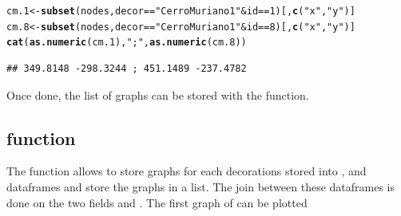 \documentclass[article]{jss}\usepackage[]{graphicx}\usepackage[]{color}
\makeatletter
\newcommand{\hlnum}[1]{\textcolor[rgb]{0.686,0.059,0.569}{#1}}%
\newcommand{\hlstr}[1]{\textcolor[rgb]{0.192,0.494,0.8}{#1}}%
\newcommand{\hlopt}[1]{\textcolor[rgb]{0,0,0}{#1}}%
\newcommand{\hlstd}[1]{\textcolor[rgb]{0.345,0.345,0.345}{#1}}%
\newcommand{\hlkwb}[1]{\textcolor[rgb]{0.69,0.353,0.396}{#1}}%
\newcommand{\hlkwd}[1]{\textcolor[rgb]{0.737,0.353,0.396}{\textbf{#1}}}%
\newenvironment{kframe}{%
 \def\at@end@of@kframe{}%
 \ifinner\ifhmode%
  \def\at@end@of@kframe{\end{minipage}}%
  \begin{minipage}{\columnwidth}%
 \fi\fi%
 \def\FrameCommand##1{\hskip\@totalleftmargin \hskip-\fboxsep
 \colorbox{shadecolor}{##1}\hskip-\fboxsep
     \hskip-\linewidth \hskip-\@totalleftmargin \hskip\columnwidth}%
 \MakeFramed {\advance\hsize-\width
   \@totalleftmargin\z@ \linewidth\hsize
   \@setminipage}}%
 {\par\unskip\endMakeFramed%
 \at@end@of@kframe}
\newenvironment{knitrout}{}{} %
\makeatother
\begin{document}
\begin{knitrout}
\color{fgcolor}\begin{kframe}
\begin{alltt}
\hlstd{cm.1} \hlkwb{<-} \hlkwd{subset}\hlstd{(nodes, decor} \hlopt{==} \hlstr{"Cerro Muriano 1"} \hlopt{&} \hlstd{id} \hlopt{==} \hlnum{1}\hlstd{)[,}\hlkwd{c}\hlstd{(}\hlstr{"x"}\hlstd{,}\hlstr{"y"}\hlstd{)]}
\hlstd{cm.8} \hlkwb{<-} \hlkwd{subset}\hlstd{(nodes, decor} \hlopt{==} \hlstr{"Cerro Muriano 1"} \hlopt{&} \hlstd{id} \hlopt{==} \hlnum{8}\hlstd{)[,}\hlkwd{c}\hlstd{(}\hlstr{"x"}\hlstd{,}\hlstr{"y"}\hlstd{)]}
\hlkwd{cat}\hlstd{(}\hlkwd{as.numeric}\hlstd{(cm.1),}\hlstr{";"}\hlstd{,}\hlkwd{as.numeric}\hlstd{(cm.8))}
\end{alltt}
\begin{verbatim}
## 349.8148 -298.3244 ; 451.1489 -237.4782
\end{verbatim}
\end{kframe}
\end{knitrout}

Once done, the list of graphs can be stored with the  function.

\subsection{ function} \label{sec:funlistdec}

The  function allows to store graphs for each decorations stored into ,  and  dataframes and store the graphs in a list. The join between these dataframes is done on the two fields  and . The first graph of can be plotted
\end{document}
